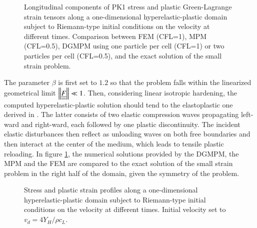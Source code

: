 \begin{figure}[h!]
  \centering
  {}
  {}
  {}
  
  \caption{Longitudinal components of PK1 stress and plastic Green-Lagrange strain tensors along a one-dimensional hyperelastic-plastic domain subject to Riemann-type initial conditions on the velocity at different times. Comparison between FEM (CFL=1), MPM (CFL=0.5), DGMPM using one particle per cell (CFL=1) or two particles per cell (CFL=0.5), and the exact solution of the small strain problem.}
  \label{fig:hep_planeWave}
\end{figure}
The parameter $\beta$ is first set to $1.2$ so that the problem falls within the linearized geometrical limit $\left\Vert{\underline{\underline{F}}}\right\Vert \ll 1$.
Then, considering linear isotropic hardening, the computed hyperelastic-plastic solution should tend to the elastoplastic one derived in \cite{Thomas_EP}.
The latter consists of two elastic compression waves propagating left-ward and right-ward, each followed by one plastic discontinuity.
The incident elastic disturbances then reflect as unloading waves on both free boundaries and then interact at the center of the medium, which leads to tensile plastic reloading.
In figure \ref{fig:hep_planeWave}, the numerical solutions provided by the DGMPM, the MPM and the FEM are compared to the exact solution of the small strain problem in the right half of the domain, given the symmetry of the problem.
\begin{figure}[h!]
  \centering
  {}
  {}
  {}
  {}
  {}
  {}
  {}
  {}
  {}
  
  
  
  \caption{Stress and plastic strain profiles along a one-dimensional hyperelastic-plastic domain subject to Riemann-type initial conditions on the velocity at different times. Initial velocity set to $v_d=4Y_H/\rho c_L$.
  }
  \label{fig:hep_planeWave_high}
\end{figure}
